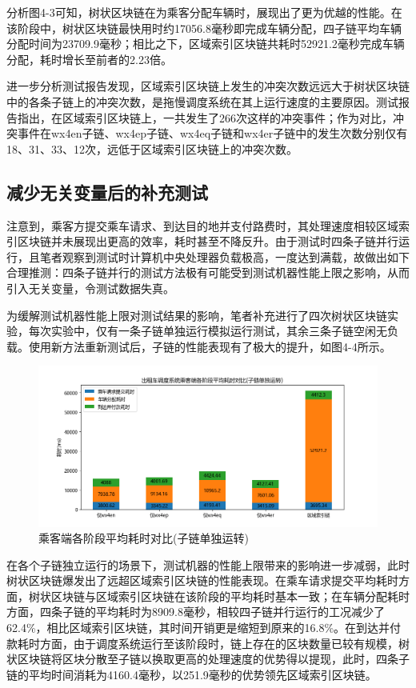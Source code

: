 分析图4-3可知，树状区块链在为乘客分配车辆时，展现出了更为优越的性能。在该阶段中，树状区块链最快用时约17056.8毫秒即完成车辆分配，四子链平均车辆分配时间为23709.9毫秒；相比之下，区域索引区块链共耗时52921.2毫秒完成车辆分配，耗时增长至前者的2.23倍。

进一步分析测试报告发现，区域索引区块链上发生的冲突次数远远大于树状区块链中的各条子链上的冲突次数，是拖慢调度系统在其上运行速度的主要原因。测试报告指出，在区域索引区块链上，一共发生了266次这样的冲突事件；作为对比，冲突事件在wx4en子链、wx4ep子链、wx4eq子链和wx4er子链中的发生次数分别仅有18、31、33、12次，远低于区域索引区块链上的冲突次数。

\subsection{减少无关变量后的补充测试}

注意到，乘客方提交乘车请求、到达目的地并支付路费时，其处理速度相较区域索引区块链并未展现出更高的效率，耗时甚至不降反升。由于测试时四条子链并行运行，且笔者观察到测试时计算机中央处理器负载极高，一度达到满载，故做出如下合理推测：四条子链并行的测试方法极有可能受到测试机器性能上限之影响，从而引入无关变量，令测试数据失真。

为缓解测试机器性能上限对测试结果的影响，笔者补充进行了四次树状区块链实验，每次实验中，仅有一条子链单独运行模拟运行测试，其余三条子链空闲无负载。使用新方法重新测试后，子链的性能表现有了极大的提升，如图4-4所示。

\begin{figure}[htbp]
    \centering
    \includegraphics[width=\textwidth]{images/乘客端测试-独立.png}
    \caption{乘客端各阶段平均耗时对比(子链单独运转)}\label{乘客端耗时对比(子链独立运行)} %
\end{figure}

在各个子链独立运行的场景下，测试机器的性能上限带来的影响进一步减弱，此时树状区块链爆发出了远超区域索引区块链的性能表现。在乘车请求提交平均耗时方面，树状区块链与区域索引区块链在该阶段的平均耗时基本一致；在车辆分配耗时方面，四条子链的平均耗时为8909.8毫秒，相较四子链并行运行的工况减少了62.4\%，相比区域索引区块链，其时间开销更是缩短到原来的16.8\%。在到达并付款耗时方面，由于调度系统运行至该阶段时，链上存在的区块数量已较有规模，树状区块链将区块分散至子链以换取更高的处理速度的优势得以提现，此时，四条子链的平均时间消耗为4160.4毫秒，以251.9毫秒的优势领先区域索引区块链。

